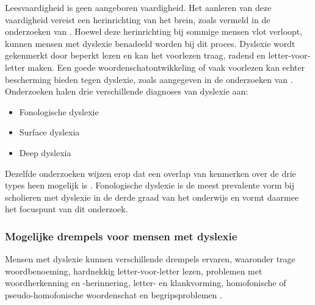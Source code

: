 
Leesvaardigheid is geen aangeboren vaardigheid. Het aanleren van deze vaardigheid vereist een herinrichting van het brein, zoals vermeld in de onderzoeken van \textcite{Bonte2020, VanDerMeer2022}. Hoewel deze herinrichting bij sommige mensen vlot verloopt, kunnen mensen met dyslexie benadeeld worden bij dit proces. Dyslexie wordt gekenmerkt door beperkt lezen en kan het voorlezen traag, radend en letter-voor-letter maken. Een goede woordenschatontwikkeling of vaak voorlezen kan echter bescherming bieden tegen dyslexie, zoals aangegeven in de onderzoeken van \textcite{Vellutino2004, Bonte2020}. Onderzoeken halen drie verschillende diagnoses van dyslexie aan:

\begin{itemize}
	\item Fonologische dyslexie
	\item Surface dyslexia
	\item Deep dyslexia
\end{itemize}

Dezelfde onderzoeken wijzen erop dat een overlap van kenmerken over de drie types heen mogelijk is \autocite{Rello2012, Vellutino2004}. Fonologische dyslexie is de meest prevalente vorm bij scholieren met dyslexie in de derde graad van het onderwijs en vormt daarmee het focuspunt van dit onderzoek.

\subsubsection{Mogelijke drempels voor mensen met dyslexie}

Mensen met dyslexie kunnen verschillende drempels ervaren, waaronder trage woordbenoeming, hardnekkig letter-voor-letter lezen, problemen met woordherkenning en -herinnering, letter- en klankvorming, homofonische of pseudo-homofonische woordenschat en begripsproblemen \autocite{Bonte2020, RiveroContreras2021, Zhang2021}. 

